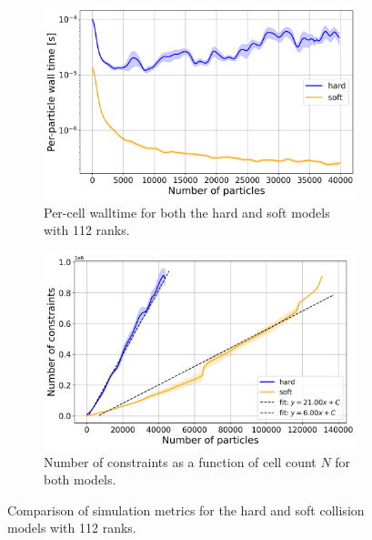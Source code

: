 \documentclass[conference]{IEEEtran}
\begin{document}
\begin{figure}[h]
    \centering
    \begin{subfigure}[b]{0.9\linewidth}
        \centering
        \includegraphics[width=\linewidth]{figures/comparison_plots/combined_num_particles_vs_wall_time_per_particle_with_fit.png}
        \caption{Per-cell walltime for both the hard and soft models with 112 ranks.}
        \label{fig:walltime_per_particle}
    \end{subfigure}


    \begin{subfigure}[b]{0.9\linewidth}
        \centering
        \includegraphics[width=\linewidth]{figures/comparison_plots/combined_num_constraints_vs_num_particles_with_fit.png}
        \caption{Number of constraints as a function of cell count $N$ for both models.}
        \label{fig:num_constraints}
    \end{subfigure}

    \caption{Comparison of simulation metrics for the hard and soft collision models with 112 ranks.}
    \label{fig:comparison_metrics}
\end{figure}
\end{document}
